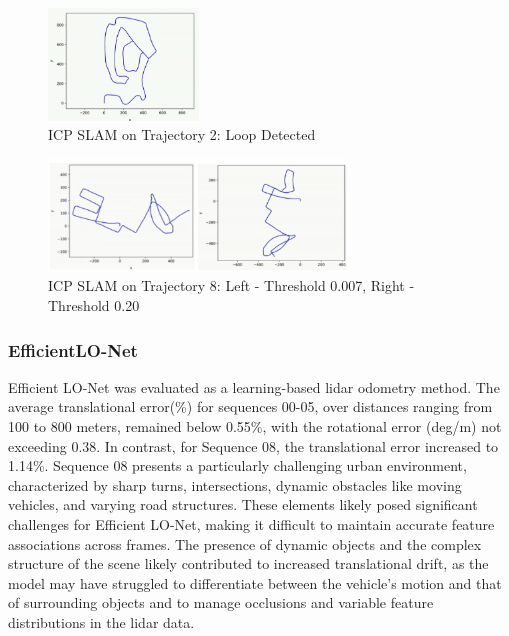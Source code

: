 \documentclass[11pt,a4paper]{article}
\begin{document}
\begin{figure}[htbp]
    \centering
    \includegraphics[width=4cm]{Reports/3-Analysis-of-Baselines/images/ICP-SLAM/KITTI_loop2.png}
    \caption{ICP SLAM on Trajectory 2: Loop Detected}
    \label{fig:icp-kitti-2}
\end{figure}

\begin{figure}[htbp]
    \centering
    \includegraphics[width=8cm]{Reports/3-Analysis-of-Baselines/images/ICP-SLAM/kitti-08.png}
    \caption{ICP SLAM on Trajectory 8: Left - Threshold 0.007, Right - Threshold 0.20}
    \label{fig:icp-kitti-8}
\end{figure}

\subsubsection{EfficientLO-Net}
Efficient LO-Net was evaluated as a learning-based lidar odometry method. The average translational error(\%) for sequences 00-05, over distances ranging from 100 to 800 meters, remained below 0.55\%, with the rotational error (deg/m) not exceeding 0.38. In contrast, for Sequence 08, the translational error increased to 1.14\%. Sequence 08 presents a particularly challenging urban environment, characterized by sharp turns, intersections, dynamic obstacles like moving vehicles, and varying road structures. These elements likely posed significant challenges for Efficient LO-Net, making it difficult to maintain accurate feature associations across frames. The presence of dynamic objects and the complex structure of the scene likely contributed to increased translational drift, as the model may have struggled to differentiate between the vehicle’s motion and that of surrounding objects and to manage occlusions and variable feature distributions in the lidar data.
\end{document}
